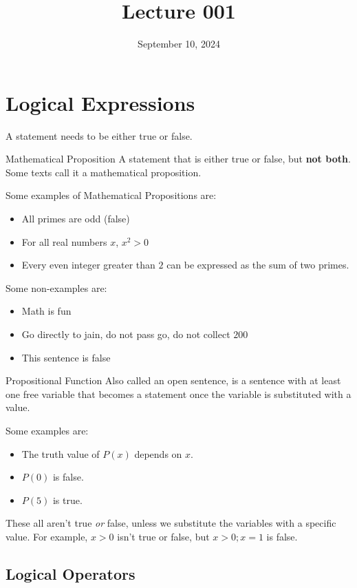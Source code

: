 \documentclass[12pt]{article}
\title{Lecture 001}
\date{September 10, 2024}
\begin{document}
\section{Logical Expressions}
\label{sec:logicalExpressions}

A statement needs to be either true or false.

\begin{definition}{Mathematical Proposition}
  A statement that is either true or false, but \textbf{not both}. Some texts call it a
  mathematical proposition.
\end{definition}

Some examples of Mathematical Propositions are:
\begin{itemize}
  \itemsep0em
  \item All primes are odd (false)
  \item For all real numbers $x$, $x^2 > 0$
  \item Every even integer greater than $2$ can be expressed as the sum of two primes.
\end{itemize}
Some non-examples are:
\begin{itemize}
  \itemsep0em
  \item Math is fun
  \item Go directly to jain, do not pass go, do not collect \textdollar $200$
  \item This sentence is false
\end{itemize}

\begin{definition}{Propositional Function}
  Also called an open sentence, is a sentence with at least one free variable that becomes
  a statement once the variable is substituted with a value.
\end{definition}

Some examples are:
\begin{itemize}
  \itemsep0em
  \item The truth value of $P(x)$ depends on $x$.
  \item $P(0)$ is false.
  \item $P(5)$ is true.
\end{itemize}

These all aren't true \textit{or} false, unless we substitute the variables with a specific
value. For example, $x > 0$ isn't true or false, but $x > 0; x = 1$ is false.

\subsection{Logical Operators}
\label{ssec:logicalOperators}
\end{document}
